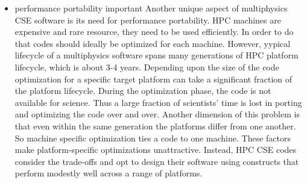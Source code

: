 \begin{itemize}
\item performance portability important
Another unique aspect of multiphysics CSE software is its need for
performance portability. HPC machines are expensive and rare resource,
they need to be used efficiently. In order to do that codes should
ideally be optimized for each machine. However, yypical lifecycle of a
multiphysics software spans many generations of HPC platform
lifecycle, which is about 3-4 years. Depending upon the size of the
code optimization for a specific target platform can take a
significant fraction of the platform lifecycle. During the
optimization phase, the code is not available for science. Thus a
large fraction of scientists' time is lost in porting and optimizing
the code over and over. Another dimension of this problem is that even
within the same generation the platforms differ from one another. So
machine specific optimization ties a code to one machine. These
factors make platform-specific optimizations unattractive. Instead,
HPC CSE codes consider the trade-offs and opt to design their software
using constructs that perform modestly well across a range of
platforms. 

\end{itemize}

